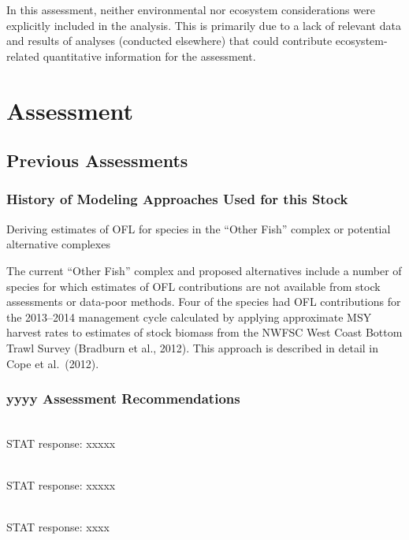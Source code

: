\documentclass[12pt,]{article}
\begin{document}
In this assessment, neither environmental nor ecosystem considerations
were explicitly included in the analysis. This is primarily due to a
lack of relevant data and results of analyses (conducted elsewhere) that
could contribute ecosystem-related quantitative information for the
assessment.

\newpage

\hypertarget{assessment}{%
\section{Assessment}\label{assessment}}

\hypertarget{previous-assessments}{%
\subsection{Previous Assessments}\label{previous-assessments}}

\hypertarget{history-of-modeling-approaches-used-for-this-stock}{%
\subsubsection{History of Modeling Approaches Used for this
Stock}\label{history-of-modeling-approaches-used-for-this-stock}}

Deriving estimates of OFL for species in the ``Other Fish'' complex or
potential alternative complexes

The current ``Other Fish'' complex and proposed alternatives include a
number of species for which estimates of OFL contributions are not
available from stock assessments or data-poor methods. Four of the
species had OFL contributions for the 2013--2014 management cycle
calculated by applying approximate MSY harvest rates to estimates of
stock biomass from the NWFSC West Coast Bottom Trawl Survey (Bradburn et
al., 2012). This approach is described in detail in Cope et al.~(2012).

\hypertarget{yyyy-assessment-recommendations}{%
\subsubsection{yyyy Assessment
Recommendations}\label{yyyy-assessment-recommendations}}

\begin{description}[style=unboxed]

  \item[Recommendation 1: ] \hfill \\

   STAT response: xxxxx

\item[Recommendation 2: ] \hfill \\

  STAT response: xxxxx

\item[Recommendation 3: ] \hfill \\

  STAT response: xxxx

  
\end{description}
\end{document}

